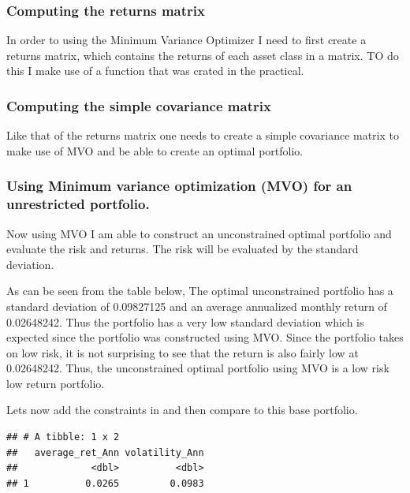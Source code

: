 \documentclass[11pt,preprint, authoryear]{elsarticle}
\numberwithin{equation}{section}
\numberwithin{figure}{section}
\numberwithin{table}{section}
\begin{document}
\hypertarget{computing-the-returns-matrix}{%
\subsubsection{Computing the returns
matrix}\label{computing-the-returns-matrix}}

In order to using the Minimum Variance Optimizer I need to first create
a returns matrix, which contains the returns of each asset class in a
matrix. TO do this I make use of a function that was crated in the
practical.

\hypertarget{computing-the-simple-covariance-matrix}{%
\subsubsection{Computing the simple covariance
matrix}\label{computing-the-simple-covariance-matrix}}

Like that of the returns matrix one needs to create a simple covariance
matrix to make use of MVO and be able to create an optimal portfolio.

\hypertarget{using-minimum-variance-optimization-mvo-for-an-unrestricted-portfolio.}{%
\subsubsection{Using Minimum variance optimization (MVO) for an
unrestricted
portfolio.}\label{using-minimum-variance-optimization-mvo-for-an-unrestricted-portfolio.}}

Now using MVO I am able to construct an unconstrained optimal portfolio
and evaluate the risk and returns. The risk will be evaluated by the
standard deviation.

As can be seen from the table below, The optimal unconstrained portfolio
has a standard deviation of 0.09827125 and an average annualized monthly
return of 0.02648242. Thus the portfolio has a very low standard
deviation which is expected since the portfolio was constructed using
MVO. Since the portfolio takes on low risk, it is not surprising to see
that the return is also fairly low at 0.02648242. Thus, the
unconstrained optimal portfolio using MVO is a low risk low return
portfolio.

Lets now add the constraints in and then compare to this base portfolio.

\begin{verbatim}
## # A tibble: 1 x 2
##   average_ret_Ann volatility_Ann
##             <dbl>          <dbl>
## 1          0.0265         0.0983
\end{verbatim}
\end{document}
